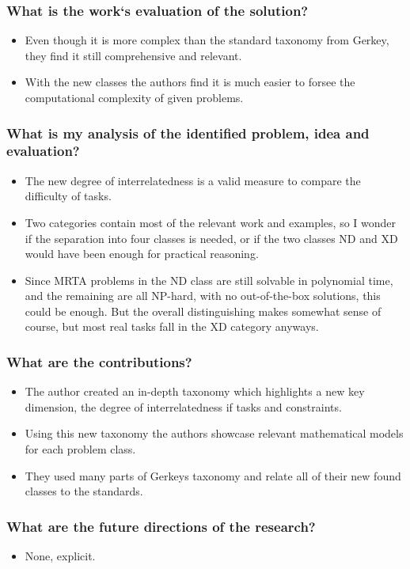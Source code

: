 \subsubsection*{What is the work`s evaluation of the solution?}
\begin{itemize}
    \item Even though it is more complex than the standard taxonomy from Gerkey, they find it still comprehensive and relevant. 
    \item With the new classes the authors find it is much easier to forsee the computational complexity of given problems.
\end{itemize}
\subsubsection*{What is my analysis of the identified problem, idea and evaluation?}
\begin{itemize}
    \item The new degree of interrelatedness is a valid measure to compare the difficulty of tasks. 
    \item Two categories contain most of the relevant work and examples, so I wonder if the separation into four classes is needed, or if the two classes ND and XD would have been enough for practical reasoning. 
    \item Since MRTA problems in the ND class are still solvable in polynomial time, and the remaining are all NP-hard, with no out-of-the-box solutions, this could be enough. But the overall distinguishing makes somewhat sense of course, but most real tasks fall in the XD category anyways.
\end{itemize}
\subsubsection*{What are the contributions?}
\begin{itemize}
    \item The author created an in-depth taxonomy which highlights a new key dimension, the degree of interrelatedness if tasks and constraints.
    \item Using this new taxonomy the authors showcase relevant mathematical models for each problem class.
    \item They used many parts of Gerkeys taxonomy and relate all of their new found classes to the standards. 
\end{itemize}
\subsubsection*{What are the future directions of the research?}
\begin{itemize}
    \item None, explicit. 
\end{itemize}
